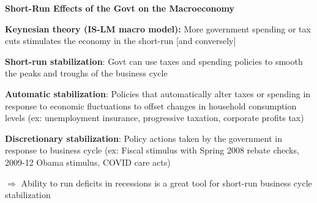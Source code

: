\documentclass[landscape]{slides}
\begin{document}
\begin{slide}
\begin{center}
{\bf Short-Run Effects of the Govt on the Macroeconomy}
\end{center}

\textbf{Keynesian theory (IS-LM macro model):} 
More government spending or tax cuts stimulates 
the economy in the short-run [and conversely]


{\bf Short-run stabilization}:
Govt can use taxes and spending policies to smooth the peaks and troughs of the business cycle

\small

{\bf Automatic stabilization}:
Policies that automatically alter taxes or spending in response to economic fluctuations to offset changes in household consumption levels (ex: unemployment insurance, progressive taxation, corporate profits tax)

{\bf Discretionary stabilization}:
Policy actions taken by the government in response to business cycle (ex: Fiscal stimulus with Spring 2008 rebate checks, 2009-12 Obama stimulus, COVID care acts)

\normalsize

$\Rightarrow$ Ability to run deficits in recessions is a great tool for short-run business cycle stabilization

\end{slide}
\end{document}
